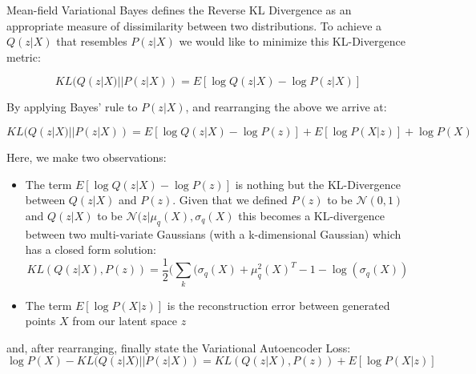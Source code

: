Mean-field Variational Bayes defines the Reverse KL Divergence as an appropriate measure of dissimilarity between two distributions. To achieve a $Q(z|X)$ that resembles $P(z|X)$ we would like to minimize this KL-Divergence metric:

\begin{equation}
    KL(Q(z|X)||P(z|X)) = E[\log Q(z|X) - \log P(z|X)]
\end{equation}

By applying Bayes' rule to $P(z|X)$, and rearranging the above we arrive at:

\begin{equation} 
    KL(Q(z|X) || P(z|X)) = E[\log Q(z|X) - \log P(z)] + E[\log P(X|z)] + \log P(X)
\end{equation}

Here, we make two observations:

\begin{itemize}
    \item The term $E[\log Q(z|X) - \log P(z)]$ is nothing but the KL-Divergence between $Q(z|X)$ and $P(z)$. Given that we defined $P(z)$ to be $\mathcal{N}(0,1)$ and $Q(z|X)$ to be $\mathcal{N}(z|\mu_q(X), \sigma_q(X)$ this becomes a KL-divergence between two multi-variate Gaussians (with a k-dimensional Gaussian) which has a closed form solution:
    \begin{equation}
        KL (Q(z|X), P(z)) = \frac{1}{2} (\sum_k (\sigma_q(X) + \mu_q^2(X)^T - 1 - \log (\sigma_q(X))
    \end{equation}
    \item The term $E[\log P(X|z)]$ is the reconstruction error between generated points $X$ from our latent space $z$
\end{itemize}
 
 and, after rearranging, finally state the Variational Autoencoder Loss:
 \begin{equation}
      \log P(X) - KL(Q(z|X) || P(z|X)) =  KL (Q(z|X), P(z)) + E[\log P(X|z)]
 \end{equation}
 
